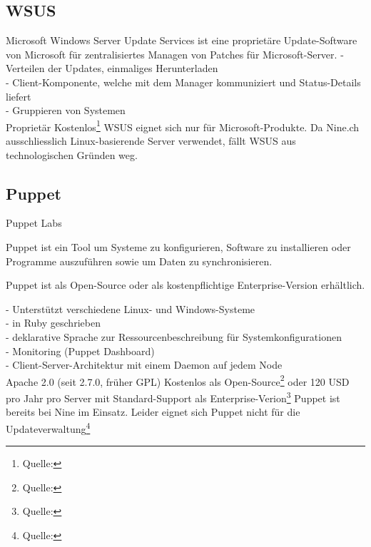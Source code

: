 \subsection{WSUS}

{Microsoft}
{Windows Server Update Services ist eine proprietäre Update-Software von Microsoft für zentralisiertes Managen von Patches für Microsoft-Server.}
{
- Verteilen der Updates, einmaliges Herunterladen\\
- Client-Komponente, welche mit dem Manager kommuniziert und Status-Details liefert\\
- Gruppieren von Systemen\\
}
{Proprietär}
{Kostenlos\footnote{Quelle: }}
{}
{WSUS eignet sich nur für Microsoft-Produkte. Da Nine.ch ausschliesslich Linux-basierende Server verwendet, fällt WSUS aus technologischen Gründen weg.}

\subsection{Puppet}

{Puppet Labs}
{Puppet ist ein Tool um Systeme zu konfigurieren, Software zu installieren oder Programme auszuführen sowie um Daten zu synchronisieren.

Puppet ist als Open-Source oder als kostenpflichtige Enterprise-Version erhältlich. }
{
- Unterstützt verschiedene Linux- und Windows-Systeme\\
- in Ruby geschrieben\\
- deklarative Sprache zur Ressourcenbeschreibung für Systemkonfigurationen\\
- Monitoring (Puppet Dashboard)\\
- Client-Server-Architektur mit einem Daemon auf jedem Node\\
}
{Apache 2.0 (seit 2.7.0, früher GPL)}
{Kostenlos als Open-Source\footnote{Quelle: } oder 120 USD pro Jahr pro Server mit Standard-Support als Enterprise-Verion\footnote{Quelle: }}
{}
{Puppet ist bereits bei Nine im Einsatz. Leider eignet sich Puppet nicht für die Updateverwaltung\footnote{Quelle: }}
